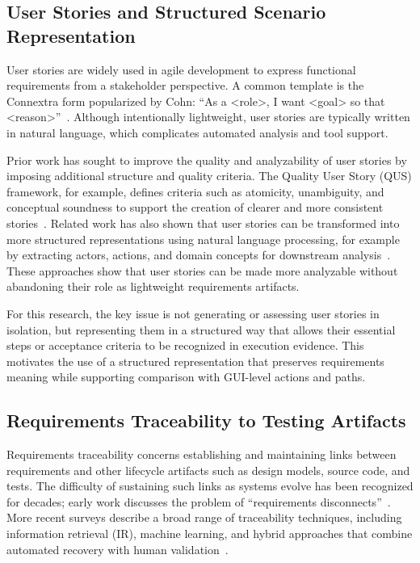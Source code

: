 \subsection{User Stories and Structured Scenario Representation}
\label{subsec:user-stories}

User stories are widely used in agile development to express functional requirements from a stakeholder perspective. A common template is the Connextra form popularized by Cohn: ``As a <role>, I want <goal> so that <reason>''~\citep{cohn2004user}. Although intentionally lightweight, user stories are typically written in natural language, which complicates automated analysis and tool support.

Prior work has sought to improve the quality and analyzability of user stories by imposing additional structure and quality criteria. The Quality User Story (QUS) framework, for example, defines criteria such as atomicity, unambiguity, and conceptual soundness to support the creation of clearer and more consistent stories~\citep{lucassen2016improving}. Related work has also shown that user stories can be transformed into more structured representations using natural language processing, for example by extracting actors, actions, and domain concepts for downstream analysis~\citep{lucassen2017visual,dalpiaz2018natural}. These approaches show that user stories can be made more analyzable without abandoning their role as lightweight requirements artifacts.

For this research, the key issue is not generating or assessing user stories in isolation, but representing them in a structured way that allows their essential steps or acceptance criteria to be recognized in execution evidence. This motivates the use of a structured representation that preserves requirements meaning while supporting comparison with GUI-level actions and paths.

\subsection{Requirements Traceability to Testing Artifacts}
\label{subsec:traceability}

Requirements traceability concerns establishing and maintaining links between requirements and other lifecycle artifacts such as design models, source code, and tests. The difficulty of sustaining such links as systems evolve has been recognized for decades; early work discusses the problem of ``requirements disconnects''~\citep{gotel1994analysis}. More recent surveys describe a broad range of traceability techniques, including information retrieval (IR), machine learning, and hybrid approaches that combine automated recovery with human validation~\citep{cleland2014software}.

